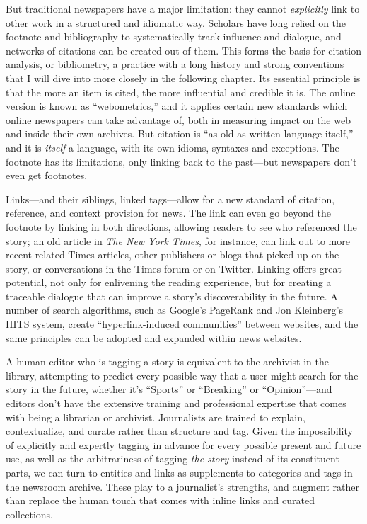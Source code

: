 But traditional newspapers have a major limitation: they cannot \emph{explicitly} link to other work in a structured and idiomatic way. Scholars have long relied on the footnote and bibliography to systematically track influence and dialogue, and networks of citations can be created out of them. %
This forms the basis for citation analysis, or bibliometry, a practice with a long history and strong conventions that I will dive into more closely in the following chapter. Its essential principle is that the more an item is cited, the more influential and credible it is. The online version is known as ``webometrics,'' and it applies certain new standards which online newspapers can take advantage of, both in measuring impact on the web and inside their own archives. But citation is ``as old as written language itself,'' and it is \emph{itself} a language, with its own idioms, syntaxes and exceptions.\autocite[1]{chakrabarti_mining_2003} The footnote has its limitations, only linking back to the past---but newspapers don't even get footnotes.

Links---and their siblings, linked tags---allow for a new standard of citation, reference, and context provision for news. The link can even go beyond the footnote by linking in both directions, allowing readers to see who referenced the story; an old article in \emph{The New York Times}, for instance, can link out to more recent related Times articles, other publishers or blogs that picked up on the story, or conversations in the Times forum or on Twitter. Linking offers great potential, not only for enlivening the reading experience, but for creating a traceable dialogue that can improve a story's discoverability in the future. A number of search algorithms, such as Google's PageRank and Jon Kleinberg's HITS system, create ``hyperlink-induced communities'' between websites, and the same principles can be adopted and expanded within news websites.\autocite[12]{chakrabarti_mining_2003}  


A human editor who is tagging a story is equivalent to the archivist in the library, attempting to predict every possible way that a user might search for the story in the future, whether it's ``Sports'' or ``Breaking'' or ``Opinion''---and editors don't have the extensive training and professional expertise that comes with being a librarian or archivist. Journalists are trained to explain, contextualize, and curate rather than structure and tag. Given the impossibility of explicitly and expertly tagging in advance for every possible present and future use, as well as the arbitrariness of tagging \emph{the story} instead of its constituent parts, we can turn to entities and links as supplements to categories and tags in the newsroom archive. These play to a journalist's strengths, and augment rather than replace the human touch that comes with inline links and curated collections.

